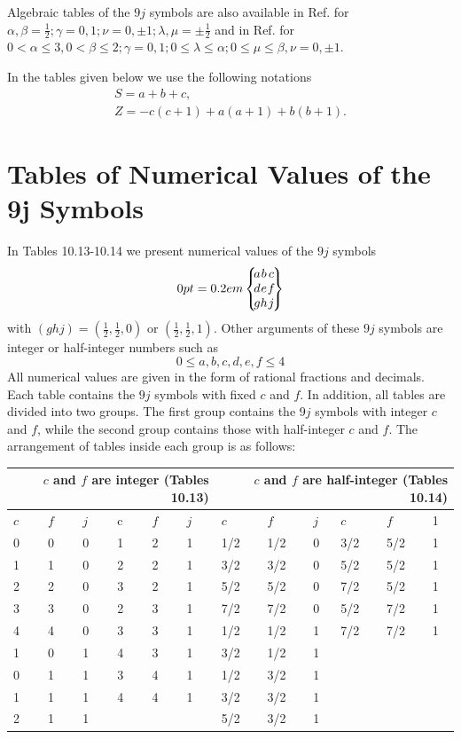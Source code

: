 Algebraic tables of the $9 j$ symbols are also available in Ref. \cite{ref120} for $\alpha, \beta=\frac{1}{2} ; \gamma=0,1 ; \nu=0, \pm 1 ; \lambda, \mu= \pm \frac{1}{2}$ and in Ref. \cite{ref045} for $0<\alpha \leq 3,0<\beta \leq 2 ; \gamma=0,1 ; 0 \leq \lambda \leq \alpha ; 0 \leq \mu \leq \beta, \nu=0, \pm 1$.

In the tables given below we use the following notations
\[
\begin{gathered}
S=a+b+c, \\
Z=-c(c+1)+a(a+1)+b(b+1) .
\end{gathered}
\]
\section{Tables of Numerical Values of the 9j Symbols}\label{sec:10.12}
In Tables 10.13-10.14 we present numerical values of the $9 j$ symbols
\[
\ninej{a}{b}{c}{d}{e}{f}{g}{h}{j}
\]
with $(g h j)=\left(\frac{1}{2}, \frac{1}{2}, 0\right)$ or $\left(\frac{1}{2}, \frac{1}{2}, 1\right)$. Other arguments of these $9 j$ symbols are integer or half-integer numbers such as
\[
0 \leq a, b, c, d, e, f \leq 4
\]
All numerical values are given in the form of rational fractions and decimals. Each table contains the $9 j$ symbols with fixed $c$ and $f$. In addition, all tables are divided into two groups. The first group contains the $9 j$ symbols with integer $c$ and $f$, while the second group contains those with half-integer $c$ and $f$. The arrangement of tables inside each group is as follows:

\begin{center}
\begin{tabular}{|l|l|l|l|l|l|l|l|l|l|l|l|}
\hline
\multicolumn{6}{|r|}{$c$ and $f$ are integer (Tables 10.13)} & \multicolumn{6}{|r|}{$c$ and $f$ are half-integer (Tables 10.14)} \\
\hline
$c$ & $f$ & $j$ & c & $f$ & $j$ & $c$ & $f$ & $j$ & $c$ & $f$ & 1 \\
\hline
0 & 0 & 0 & 1 & 2 & 1 & 1/2 & 1/2 & 0 & 3/2 & 5/2 & 1 \\
\hline
1 & 1 & 0 & 2 & 2 & 1 & 3/2 & 3/2 & 0 & 5/2 & 5/2 & 1 \\
\hline
2 & 2 & 0 & 3 & 2 & 1 & 5/2 & 5/2 & 0 & 7/2 & 5/2 & 1 \\
\hline
3 & 3 & 0 & 2 & 3 & 1 & 7/2 & 7/2 & 0 & 5/2 & 7/2 & 1 \\
\hline
4 & 4 & 0 & 3 & 3 & 1 & 1/2 & 1/2 & 1 & 7/2 & 7/2 & 1 \\
\hline
1 & 0 & 1 & 4 & 3 & 1 & 3/2 & 1/2 & 1 &  &  &  \\
\hline
0 & 1 & 1 & 3 & 4 & 1 & 1/2 & 3/2 & 1 &  &  &  \\
\hline
1 & 1 & 1 & 4 & 4 & 1 & 3/2 & 3/2 & 1 &  &  &  \\
\hline
2 & 1 & 1 &  &  &  & 5/2 & 3/2 & 1 &  &  &  \\
\hline
\end{tabular}
\end{center}

